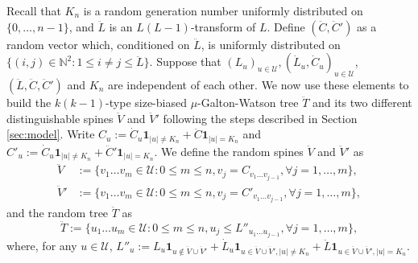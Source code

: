 \documentclass[12pt,a4paper]{amsart}
\numberwithin{equation}{section}
\begin{document}
	Recall that $K_n$ is a random generation number uniformly distributed on $\{0,\dots,n-1\}$,
	and $\ddot L$ is an $L(L-1)$-transform of $L$.
	Define $(\ddot C,\ddot C')$ as a random vector which, conditioned on $\ddot L$, is uniformly distributed on $\{(i,j)\in\mathbb N^2:1\leq i\neq j\leq \ddot L\}$.
	Suppose that $(L_u)_{u\in\mathcal U}, (\dot L_u,\dot C_u)_{u\in \mathcal U}$, $(\ddot L,\ddot C,\ddot C')$ and $K_n$ are independent of each other.
	We now use these elements to build the $k(k-1)$-type size-biased $\mu$-Galton-Watson tree $\ddot T$ and its two different distinguishable spines $\ddot V$ and $\ddot V'$ following the steps described in Section \ref{sec:model}.
	Write $C_u:=\dot C_u\mathbf 1_{|u|\neq K_n}+\ddot C\mathbf 1_{|u|=K_n}$ and $C'_u:=\dot C_u\mathbf 1_{|u|\neq K_n}+\ddot C'\mathbf 1_{|u|=K_n}$.
	We define the random spines $\ddot V$ and $\ddot V'$ as
\[ \begin{split}
        \ddot V
	&:= \{v_1\dots v_m\in \mathcal U:0\le m\le n, v_j= C_{v_1\dots v_{j-1}},\forall j=1,\dots,m\},
	\\ \ddot V'
	&:= \{v_1\dots v_m\in \mathcal U:0\le m \le n, v_j= C'_{v_1\dots v_{j-1}},\forall j=1,\dots,m\},
\end{split}\]
	and the random tree $\ddot T$ as
\[
	    \ddot T
	:=
		\{u_1\dots u_m\in\mathcal U: 0\le m\le n,u_j\leq L''_{u_1\dots u_{j-1}},\forall j=1,\dots,m\},
\]
	where, for any $u\in\mathcal U$, $L''_u:=L_u \mathbf 1_{u\not\in \ddot V\cup\ddot V'}+\dot L_u \mathbf 1_{u\in \ddot V\cup\ddot V',|u|\neq K_n}+\ddot L\mathbf 1_{u\in \ddot V\cup\ddot V',|u|=K_n}$.
\end{document}
